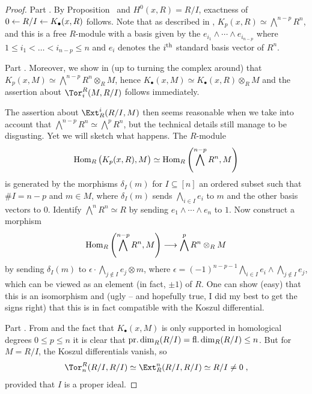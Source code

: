 \documentclass[a4paper,parskip=half,numbers=enddot, DIV=12]{scrreprt}
\begin{document}
\begin{proof}
	Part . By Proposition~ and $H^0(x,R)=R/I$, exactness of $0\lmorphism R/I\lmorphism K_\bullet(x,R)$ follows. Note that as described in \cite[Remark~2.1.2]{alggeo2}, $K_p(x,R)\simeq \bigwedge^{n-p}R^n$, and this is a free $R$-module with a basis given by the $e_{i_1}\wedge \cdots\wedge e_{i_{n-p}}$ where $1\leq i_1<\ldots<i_{n-p}\leq n$ and $e_i$ denotes the $i^{\text{th}}$ standard basis vector of $R^n$.
	
	Part . Moreover, we show in \cite[Remark~2.1.2]{alggeo2} (up to turning the complex around) that $K_p(x,M)\simeq \bigwedge^{n-p}R^n\otimes_RM$, hence $K_\bullet(x,M)\simeq K_\bullet(x,R)\otimes_RM$ and the assertion about $\Tor_i^R(M,R/I)$ follows immediately. 
	
	The assertion about $\Ext_R^i(R/I,M)$ then seems reasonable when we take into account that $\bigwedge^{n-p}R^n\simeq \bigwedge^pR^n$, but the technical details still manage to be disgusting. Yet we will sketch what happens. The $R$-module 
	\begin{align*}
		\operatorname{Hom}_R\big(K_p(x,R),M\big)\simeq \operatorname{Hom}_R\left(\bigwedge^{n-p}R^n,M\right)
	\end{align*}
	is generated by the morphisms $\delta_I(m)$ for $I\subseteq [n]$ an ordered subset such that $\#I=n-p$ and $m\in M$, where $\delta_I(m)$ sends $\bigwedge_{i\in I}e_i$ to $m$ and the other basis vectors to $0$. Identify $\bigwedge^n R^n\simeq R$ by sending $e_1\wedge\cdots\wedge e_n$ to $1$. Now construct a morphism 
	\begin{align*}
		\Hom_R\left(\bigwedge^{n-p}R^n,M\right)\morphism \bigwedge^pR^n\otimes_R M
	\end{align*}
	by sending $\delta_I(m)$ to $\epsilon\cdot \bigwedge_{j\notin I}e_j\otimes m$, where $\epsilon=(-1)^{n-p-1}\bigwedge_{i\in I}e_i\wedge\bigwedge_{j\notin I}e_j$, which can be viewed as an element (in fact, $\pm 1$) of $R$. One can show (easy) that this is an isomorphism and (ugly -- and hopefully true, I did my best to get the signs right) that this is in fact compatible with the Koszul differential.
	
	Part . From  and the fact that $K_\bullet(x,M)$ is only supported in homological degrees $0\leq p\leq n$ it is clear that $\operatorname{pr.dim}_R(R/I)=\operatorname{fl.dim}_R(R/I)\leq n$. But for $M=R/I$, the Koszul differentials vanish, so
	\begin{align*}
		\Tor_n^R(R/I,R/I)\simeq\Ext_R^n(R/I,R/I)\simeq R/I\neq 0\;, 
	\end{align*}
	provided that $I$ is a proper ideal.
\end{proof}
\end{document}
